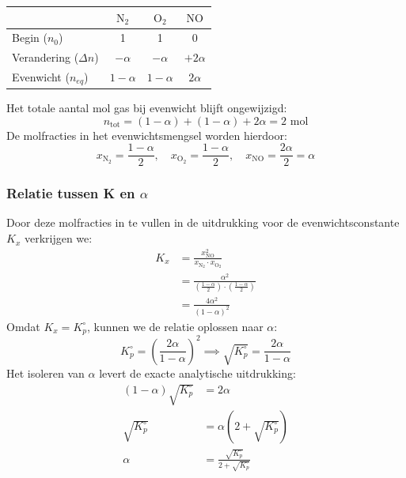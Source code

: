 \documentclass[11pt,a4paper]{article}
\begin{document}
\begin{table}[h]
    \centering
    \begin{tabular}{lccc}
        \toprule
        & $\text{N}_2$ & $\text{O}_2$ & $\text{NO}$ \\
        \midrule
        Begin ($n_0$) & 1 & 1 & 0 \\
        Verandering ($\Delta n$) & $-\alpha$ & $-\alpha$ & $+2\alpha$ \\
        Evenwicht ($n_{eq}$) & $1-\alpha$ & $1-\alpha$ & $2\alpha$ \\
        \bottomrule
    \end{tabular}
\end{table}

Het totale aantal mol gas bij evenwicht blijft ongewijzigd:
\begin{equation}
    n_{\text{tot}} = (1-\alpha) + (1-\alpha) + 2\alpha = 2 \text{ mol}
\end{equation}
De molfracties in het evenwichtsmengsel worden hierdoor:
\begin{equation}
    x_{\text{N}_2} = \frac{1-\alpha}{2}, \quad x_{\text{O}_2} = \frac{1-\alpha}{2}, \quad x_{\text{NO}} = \frac{2\alpha}{2} = \alpha
\end{equation}

\subsubsection{ Relatie tussen K en $\alpha$}
Door deze molfracties in te vullen in de uitdrukking voor de evenwichtsconstante $K_x$ verkrijgen we:
\begin{align}
    K_x &= \frac{x_{\text{NO}}^2}{x_{\text{N}_2} \cdot x_{\text{O}_2}} \\
        &= \frac{\alpha^2}{\left(\frac{1-\alpha}{2}\right) \cdot \left(\frac{1-\alpha}{2}\right)} \\
        &= \frac{4\alpha^2}{(1-\alpha)^2}
\end{align}
Omdat $K_x = K_p^\circ$, kunnen we de relatie oplossen naar $\alpha$:
\begin{equation}
    K_p^\circ = \left( \frac{2\alpha}{1-\alpha} \right)^2 \implies \sqrt{K_p^\circ} = \frac{2\alpha}{1-\alpha}
\end{equation}
Het isoleren van $\alpha$ levert de exacte analytische uitdrukking:
\begin{align}
    (1-\alpha) \sqrt{K_p^\circ} &= 2\alpha \\
    \sqrt{K_p^\circ} &= \alpha \left( 2 + \sqrt{K_p^\circ} \right) \\
    \alpha &= \frac{\sqrt{K_p^\circ}}{2 + \sqrt{K_p^\circ}}
\end{align}
\end{document}
